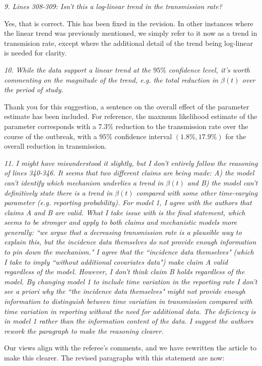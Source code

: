\documentclass[11pt]{article}
\newcommand\report[1]{{\color{mygreen} \vspace{1mm}\hspace{0.25in}\parbox{6in}{\em #1}}}
\begin{document}
\report{9.
  Lines 308-309: Isn't this a log-linear trend in the transmission rate?
}

Yes, that is correct. This has been fixed in the revision. In other instances where the linear trend was previously mentioned, we simply refer to it now as a trend in transmision rate, except where the additional detail of the trend being log-linear is needed for clarity.

\report{10.
  While the data support a linear trend at the $95\%$ confidence level, it's worth commenting on the magnitude of the trend, e.g. the total reduction in $\beta(t)$ over the period of study.
}

Thank you for this suggestion, a sentence on the overall effect of the parameter estimate has been included.
For reference, the maxmum likelihood estimate of the parameter corresponds with a 7.3\% reduction to the transmission rate over the course of the outbreak, with a $95\%$ confidence interval $(1.8\%, 17.9\%)$ for the overall reduction in transmission.

\report{11.
  I might have misunderstood it slightly, but I don't entirely follow the reasoning of lines 340-346. It seems that two different claims are being made: A) the model can’t identify which mechanism underlies a trend in $\beta(t)$ and B) the model can't definitively state there is a trend in $\beta(t)$ compared with some other time-varying parameter (e.g. reporting probability). For model 1, I agree with the authors that claims A and B are valid. What I take issue with is the final statement, which seems to be stronger and apply to both claims and mechanistic models more generally: ``we argue that a decreasing transmission rate is a plausible way to explain this, but the incidence data themselves do not provide enough information to pin down the mechanism." I agree that the ``incidence data themselves" (which I take to imply ``without additional covariates data") make claim A valid regardless of the model. However, I don’t think claim B holds regardless of the model. By changing model 1 to include time variation in the reporting rate I don't see \emph{a priori} why the ``the incidence data themselves" might not provide enough information to distinguish between time variation in transmission compared with time variation in reporting without the need for additional data. The deficiency is in model 1 rather than the information content of the data. I suggest the authors rework the paragraph to make the reasoning clearer.
}

Our views align with the referee's comments, and we have rewritten the article to make this clearer. The revised paragraphs with this statement are now:
\end{document}
